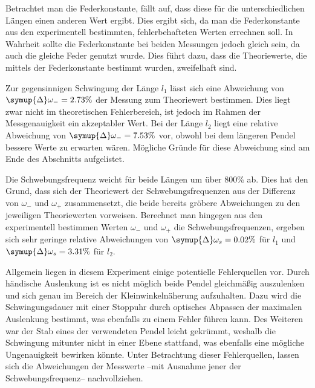 Betrachtet man die Federkonstante, fällt auf, dass diese für die unterschiedlichen Längen einen anderen Wert ergibt. Dies ergibt sich, da man die Federkonstante aus den experimentell
bestimmten, fehlerbehafteten Werten errechnen soll. In Wahrheit sollte die Federkonstante bei beiden Messungen jedoch gleich sein, da auch die gleiche Feder 
genutzt wurde. Dies führt dazu, dass die Theoriewerte, die mittels der Federkonstante bestimmt wurden, zweifelhaft sind.

Zur gegensinnigen Schwingung der Länge $l_1$ lässt sich eine Abweichung von $\symup{\Delta}\omega_{-} = 2.73\%$ der Messung zum Theoriewert bestimmen. 
Dies liegt zwar nicht im theoretischen Fehlerbereich, ist jedoch im Rahmen der Messgenauigkeit ein akzeptabler Wert.
Bei der Länge $l_2$ liegt eine relative Abweichung von $\symup{\Delta}\omega_{-} = 7.53\%$ vor, obwohl bei dem längeren Pendel bessere Werte zu erwarten wären. 
Mögliche Gründe für diese Abweichung sind am Ende des Abschnitts aufgelistet.

Die Schwebungsfrequenz weicht für beide Längen um über 800\% ab. Dies hat den Grund, dass sich der Theoriewert der Schwebungsfrequenzen aus der Differenz 
von $\omega_-$ und $\omega_+$ zusammensetzt, die beide bereits gröbere Abweichungen zu den jeweiligen Theoriewerten vorweisen. 
Berechnet man hingegen aus den experimentell bestimmen Werten $\omega_-$ und $\omega_+$ die Schwebungsfrequenzen, 
ergeben sich sehr geringe relative Abweichungen von $\symup{\Delta}\omega_{s} = 0.02\%$ für $l_1$ und $\symup{\Delta}\omega_{s} = 3.31\%$ für $l_2$. 

Allgemein liegen in diesem Experiment einige potentielle Fehlerquellen vor. Durch händische Auslenkung ist es nicht möglich beide Pendel gleichmäßig auszulenken und sich
genau im Bereich der Kleinwinkelnäherung aufzuhalten. Dazu wird die Schwingungsdauer mit einer Stoppuhr durch optisches Abpassen der maximalen Auslenkung bestimmt,
was ebenfalls zu einem Fehler führen kann. Des Weiteren war der Stab eines der verwendeten Pendel leicht gekrümmt, weshalb die Schwingung mitunter nicht in einer
Ebene stattfand, was ebenfalls eine mögliche Ungenauigkeit bewirken könnte.
Unter Betrachtung dieser Fehlerquellen, lassen sich die Abweichungen der Messwerte --mit Ausnahme jener der Schwebungsfrequenz-- nachvollziehen.
